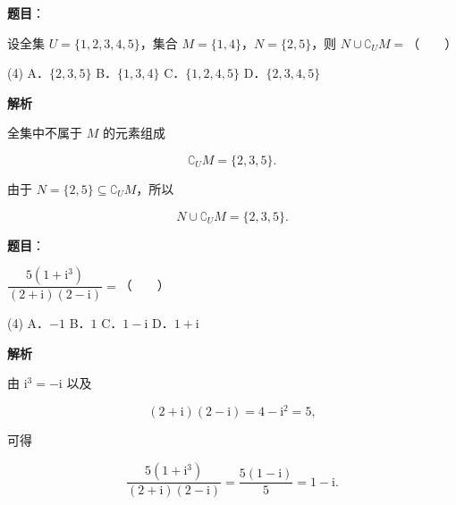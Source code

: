 \begin{answer}

\textbf{题目}：

设全集 $U=\{1,2,3,4,5\}$，集合 $M=\{1,4\}$，$N=\{2,5\}$，则 $N\cup\complement_U M=$\mbox{（　　）}

\begin{gkopts}(4)
\task A．$\{2,3,5\}$
\task B．$\{1,3,4\}$
\task C．$\{1,2,4,5\}$
\task D．$\{2,3,4,5\}$
\end{gkopts}

\textbf{解析}

全集中不属于 $M$ 的元素组成

\nopagebreak[4]
\[
\complement_U M=\{2,3,5\}.
\]

由于 $N=\{2,5\}\subseteq\complement_U M$，所以

\nopagebreak[4]
\[
N\cup\complement_U M=\{2,3,5\}.
\]


\end{answer}
\begin{answer}

\textbf{题目}：

$\dfrac{5(1+\mathrm i^3)}{(2+\mathrm i)(2-\mathrm i)}=$\mbox{（　　）}

\begin{gkopts}(4)
\task A．$-1$
\task B．$1$
\task C．$1-\mathrm i$
\task D．$1+\mathrm i$
\end{gkopts}

\textbf{解析}

由 $\mathrm i^3=-\mathrm i$ 以及

\nopagebreak[4]
\[
(2+\mathrm i)(2-\mathrm i)=4-\mathrm i^2=5,
\]

可得

\nopagebreak[4]
\[
\frac{5(1+\mathrm i^3)}{(2+\mathrm i)(2-\mathrm i)}
=\frac{5(1-\mathrm i)}5=1-\mathrm i.
\]


\end{answer}
